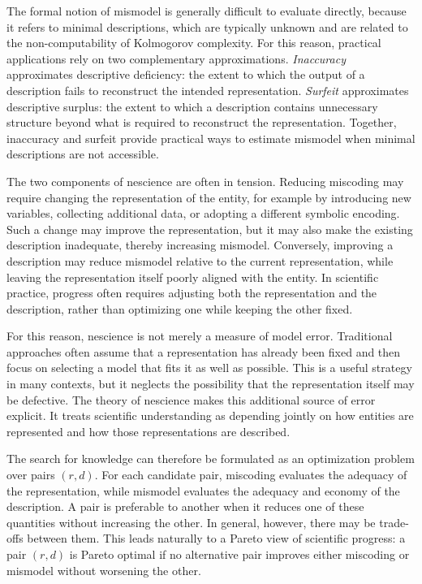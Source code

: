 The formal notion of mismodel is generally difficult to evaluate directly, because it refers to minimal descriptions, which are typically unknown and are related to the non-computability of Kolmogorov complexity. For this reason, practical applications rely on two complementary approximations. \emph{Inaccuracy} approximates descriptive deficiency: the extent to which the output of a description fails to reconstruct the intended representation. \emph{Surfeit} approximates descriptive surplus: the extent to which a description contains unnecessary structure beyond what is required to reconstruct the representation. Together, inaccuracy and surfeit provide practical ways to estimate mismodel when minimal descriptions are not accessible.

The two components of nescience are often in tension. Reducing miscoding may require changing the representation of the entity, for example by introducing new variables, collecting additional data, or adopting a different symbolic encoding. Such a change may improve the representation, but it may also make the existing description inadequate, thereby increasing mismodel. Conversely, improving a description may reduce mismodel relative to the current representation, while leaving the representation itself poorly aligned with the entity. In scientific practice, progress often requires adjusting both the representation and the description, rather than optimizing one while keeping the other fixed.

For this reason, nescience is not merely a measure of model error. Traditional approaches often assume that a representation has already been fixed and then focus on selecting a model that fits it as well as possible. This is a useful strategy in many contexts, but it neglects the possibility that the representation itself may be defective. The theory of nescience makes this additional source of error explicit. It treats scientific understanding as depending jointly on how entities are represented and how those representations are described.

The search for knowledge can therefore be formulated as an optimization problem over pairs $(r,d)$. For each candidate pair, miscoding evaluates the adequacy of the representation, while mismodel evaluates the adequacy and economy of the description. A pair is preferable to another when it reduces one of these quantities without increasing the other. In general, however, there may be trade-offs between them. This leads naturally to a Pareto view of scientific progress: a pair $(r,d)$ is Pareto optimal if no alternative pair improves either miscoding or mismodel without worsening the other.

